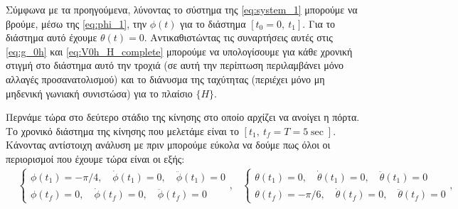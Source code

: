\documentclass[12pt]{article} %
\numberwithin{equation}{section}  %
\begin{document}
Σύμφωνα με τα προηγούμενα, λύνοντας το σύστημα της \eqref{eq:system_1} μπορούμε να βρούμε, μέσω της \eqref{eq:phi_1}, την $\phi(t)$ για το διάστημα $[t_0 =0,\  t_1]$. 
Για το διάστημα αυτό έχουμε $\theta(t) = 0$. 
Αντικαθιστώντας τις συναρτήσεις αυτές στις \eqref{eq:g_0h} και \eqref{eq:V0h_H_complete} μπορούμε να υπολογίσουμε για κάθε χρονική στιγμή στο διάστημα αυτό την τροχιά (σε αυτή την περίπτωση περιλαμβάνει μόνο αλλαγές προσανατολισμού) και το διάνυσμα της ταχύτητας (περιέχει μόνο μη μηδενική γωνιακή συνιστώσα) για το πλαίσιο $\{H\}$. 

Περνάμε τώρα στο δεύτερο στάδιο της κίνησης στο οποίο αρχίζει να ανοίγει η πόρτα. 
Το χρονικό διάστημα της κίνησης που μελετάμε είναι το $[t_1,\  t_f = T = 5 \sec]$.
Κάνοντας αντίστοιχη ανάλυση με πριν μπορούμε εύκολα να δούμε πως όλοι οι περιορισμοί που έχουμε τώρα είναι οι εξής:
\begin{align}
    &\left\{
    \begin{aligned}
        \phi(t_1) = -\pi/4, \quad \dot\phi(t_1) = 0, \quad \ddot\phi(t_1) = 0 \\
        \phi(t_f) = 0, \quad \dot\phi(t_f) = 0, \quad \ddot\phi(t_f) = 0
    \end{aligned},
    \right.
    &\left\{
    \begin{aligned}
        \theta(t_1) = 0, \quad \dot\theta(t_1) = 0, \quad \ddot\theta(t_1) = 0 \\
        \theta(t_f) = -\pi / 6, \quad \dot\theta(t_f) = 0, \quad \ddot\theta(t_f) = 0
    \end{aligned},
    \right.
    \label{eq:conditions_part2_theta}
\end{align}
\end{document}
